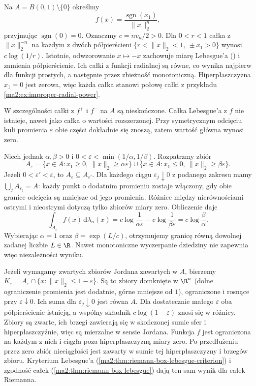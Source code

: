 \begin{przyklad}
\label{ma2:ex:improper-asymmetric-cut}
Na $A=B(0,1)\setminus\{0\}$ określmy
\[
 f(x)=\frac{\operatorname{sgn}(x_1)}{\|x\|_2^n},
\]
przyjmując $\operatorname{sgn}(0)=0$.
Oznaczmy $c=nv_n/2>0$.
Dla $0<r<1$ całka z $\|x\|_2^{-n}$
na każdym z dwóch półpierścieni
$\{r<\|x\|_2<1,\ \pm x_1>0\}$
wynosi $c\log(1/r)$.
Istotnie, odwzorowanie $x\mapsto-x$
zachowuje miarę Lebesgue'a
()
i zamienia półpierścienie. Ich całki
z funkcji radialnej są równe, co wynika
najpierw dla funkcji prostych, a następnie
przez zbieżność monotoniczną.
Hiperpłaszczyzna $x_1=0$ jest zerowa,
więc każda całka stanowi połowę całki
z przykładu \ref{ma2:ex:improper-radial-power}.

W szczególności całki z $f^+$ i $f^-$
na $A$ są nieskończone. Całka Lebesgue'a
z $f$ nie istnieje, nawet jako całka
o wartości rozszerzonej.
Przy symetrycznym odcięciu kuli promienia
$\varepsilon$ obie części dokładnie się
znoszą, zatem wartość główna wynosi zero.

Niech jednak $\alpha,\beta>0$ i
$0<\varepsilon<\min(1/\alpha,1/\beta)$.
Rozpatrzmy zbiór
\[
 A_\varepsilon=
 \{x\in A:x_1\ge0,\ \|x\|_2\ge\alpha\varepsilon\}
 \cup
 \{x\in A:x_1\le0,\ \|x\|_2\ge\beta\varepsilon\}.
\]
Jeżeli $0<\varepsilon'<\varepsilon$,
to $A_\varepsilon\subseteq A_{\varepsilon'}$.
Dla każdego ciągu $\varepsilon_j\downarrow0$
z podanego zakresu mamy
$\bigcup_j A_{\varepsilon_j}=A$:
każdy punkt o dodatnim promieniu zostaje
włączony, gdy obie granice odcięcia są
mniejsze od jego promienia. Różnice
między nierównościami ostrymi i nieostrymi
dotyczą tylko zbiorów miary zero.
Obliczenie daje
\[
 \int_{A_\varepsilon} f(x)\,\mathrm d\lambda_n(x)
 =c\log\frac1{\alpha\varepsilon}
  -c\log\frac1{\beta\varepsilon}
 =c\log\frac{\beta}{\alpha}.
\]
Wybierając $\alpha=1$ oraz
$\beta=\exp(L/c)$, otrzymujemy granicę
równą dowolnej zadanej liczbie $L\in\R$.
Nawet monotoniczne wyczerpanie dziedziny
nie zapewnia więc niezależności wyniku.

Jeżeli wymagamy zwartych zbiorów Jordana
zawartych w $A$, bierzemy
$K_\varepsilon=A_\varepsilon\cap
\{x:\|x\|_2\le1-\varepsilon\}$.
Są to zbiory domknięte w $\R^n$ (dolne
ograniczenie promienia jest dodatnie,
górne mniejsze od $1$), ograniczone i
rosnące przy $\varepsilon\downarrow0$.
Ich suma dla $\varepsilon_j\downarrow0$
jest równa $A$. Dla dostatecznie małego
$\varepsilon$ oba półpierścienie istnieją,
a wspólny składnik $c\log(1-\varepsilon)$
znosi się w różnicy. Zbiory są zwarte,
ich brzegi zawierają się w skończonej
sumie sfer i hiperpłaszczyźnie, więc są
mierzalne w sensie Jordana.
Funkcja $f$ jest ograniczona na każdym
z nich i ciągła poza hiperpłaszczyzną
miary zero. Po przedłużeniu przez zero
zbiór nieciągłości jest zawarty w sumie
tej hiperpłaszczyzny i brzegów zbioru.
Kryterium Lebesgue'a
(\ref{ma2:thm:riemann-box-lebesgue-criterion})
i zgodność całek
(\ref{ma2:thm:riemann-box-lebesgue})
dają ten sam wynik dla całek Riemanna.
\end{przyklad}

